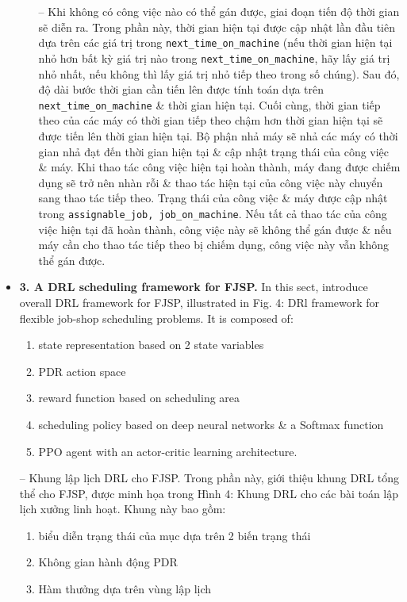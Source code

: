 \documentclass{article}
\begin{document}
\begin{itemize}
\begin{itemize}
        -- Khi không có công việc nào có thể gán được, giai đoạn tiến độ thời gian sẽ diễn ra. Trong phần này, thời gian hiện tại được cập nhật lần đầu tiên dựa trên các giá trị trong \verb|next_time_on_machine| (nếu thời gian hiện tại nhỏ hơn bất kỳ giá trị nào trong \verb|next_time_on_machine|, hãy lấy giá trị nhỏ nhất, nếu không thì lấy giá trị nhỏ tiếp theo trong số chúng). Sau đó, độ dài bước thời gian cần tiến lên được tính toán dựa trên \verb|next_time_on_machine| \& thời gian hiện tại. Cuối cùng, thời gian tiếp theo của các máy có thời gian tiếp theo chậm hơn thời gian hiện tại sẽ được tiến lên thời gian hiện tại. Bộ phận nhả máy sẽ nhả các máy có thời gian nhả đạt đến thời gian hiện tại \& cập nhật trạng thái của công việc \& máy. Khi thao tác công việc hiện tại hoàn thành, máy đang được chiếm dụng sẽ trở nên nhàn rỗi \& thao tác hiện tại của công việc này chuyển sang thao tác tiếp theo. Trạng thái của công việc \& máy được cập nhật trong \verb|assignable_job, job_on_machine|. Nếu tất cả thao tác của công việc hiện tại đã hoàn thành, công việc này sẽ không thể gán được \& nếu máy cần cho thao tác tiếp theo bị chiếm dụng, công việc này vẫn không thể gán được.
    \end{itemize}
    \item {\bf3. A DRL scheduling framework for FJSP.} In this sect, introduce overall DRL framework for FJSP, illustrated in {\sf Fig. 4: DRl framework for flexible job-shop scheduling problems}. It is composed of:
    \begin{enumerate}
        \item state representation based on 2 state variables
        \item PDR action space
        \item reward function based on scheduling area
        \item scheduling policy based on deep neural networks \& a Softmax function
        \item PPO agent with an actor-critic learning architecture.
    \end{enumerate}
    -- {\sf Khung lập lịch DRL cho FJSP.} Trong phần này, giới thiệu khung DRL tổng thể cho FJSP, được minh họa trong {\sf Hình 4: Khung DRL cho các bài toán lập lịch xưởng linh hoạt}. Khung này bao gồm:
    \begin{enumerate}
        \item biểu diễn trạng thái của mục dựa trên 2 biến trạng thái
        \item Không gian hành động PDR
        \item Hàm thưởng dựa trên vùng lập lịch

\end{enumerate}
\end{itemize}
\end{document}
